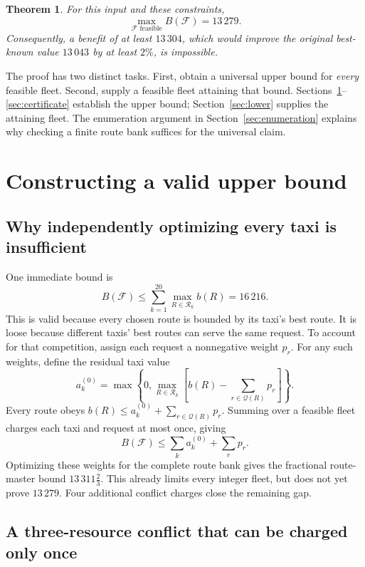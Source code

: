 \documentclass[11pt,a4paper]{article}
\newtheorem{theorem}{Theorem}
\newcommand{\R}{\mathcal R}
\newcommand{\Q}{\mathcal Q}
\newcommand{\F}{\mathcal F}
\begin{document}
\begin{theorem}\label{thm:optimum}
For this input and these constraints,
\[
 \max_{\F\text{ feasible}}B(\F)=13\,279.
\]
Consequently, a benefit of at least $13\,304$, which would improve the original
best-known value $13\,043$ by at least $2\%$, is impossible.
\end{theorem}

The proof has two distinct tasks. First, obtain a universal upper bound for
\emph{every} feasible fleet. Second, supply a feasible fleet attaining that
bound. Sections~\ref{sec:bound}--\ref{sec:certificate} establish the upper
bound; Section~\ref{sec:lower} supplies the attaining fleet. The enumeration
argument in Section~\ref{sec:enumeration} explains why checking a finite
route bank suffices for the universal claim.

\section{Constructing a valid upper bound}\label{sec:bound}

\subsection{Why independently optimizing every taxi is insufficient}

One immediate bound is
\[
 B(\F)\leq \sum_{k=1}^{20}\max_{R\in\R_k}b(R)=16\,216.
\]
This is valid because every chosen route is bounded by its taxi's best route.
It is loose because different taxis' best routes can serve the same request.
To account for that competition, assign each request a nonnegative weight
$p_r$. For any such weights, define the residual taxi value
\[
 a_k^{(0)}=\max\left\{0,\max_{R\in\R_k}
       \left[b(R)-\sum_{r\in\Q(R)}p_r\right]\right\}.
\]
Every route obeys $b(R)\leq a_k^{(0)}+\sum_{r\in\Q(R)}p_r$. Summing over a
feasible fleet charges each taxi and request at most once, giving
\[
 B(\F)\leq \sum_k a_k^{(0)}+\sum_r p_r.
\]
Optimizing these weights for the complete route bank gives the fractional
route-master bound $13\,311\frac{2}{3}$. This already limits every integer
fleet, but does not yet prove $13\,279$. Four additional conflict charges
close the remaining gap.

\subsection{A three-resource conflict that can be charged only once}
\end{document}
